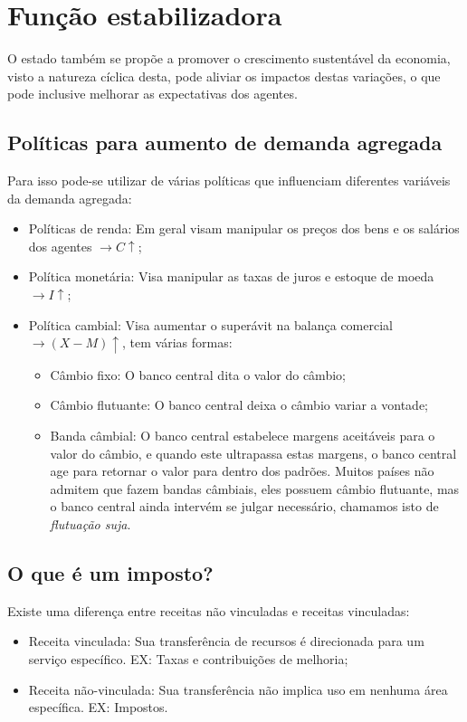 \documentclass[12pt,a4paper,oneside,brazil]{abntex2}
\begin{document}
\section{Função estabilizadora}
O estado também se propõe a promover o crescimento sustentável da economia, visto a natureza cíclica desta, pode aliviar os impactos destas variações, o que pode inclusive melhorar as expectativas dos agentes. 
\subsection{Políticas para aumento de demanda agregada}
Para isso pode-se utilizar de várias políticas que influenciam diferentes variáveis da demanda agregada:
\begin{itemize}
\item Políticas de renda: Em geral visam manipular os preços dos bens e os salários dos agentes $ \rightarrow C \uparrow$;
\item Política monetária: Visa manipular as taxas de juros e estoque de moeda $ \rightarrow I \uparrow$;
\item Política cambial: Visa aumentar o superávit na balança comercial $ \rightarrow (X - M) \uparrow$, tem várias formas:
\begin{itemize}
\item Câmbio fixo: O banco central dita o valor do câmbio;
\item Câmbio flutuante: O banco central deixa o câmbio variar a vontade;
\item Banda câmbial: O banco central estabelece margens aceitáveis para o valor do câmbio, e quando este ultrapassa estas margens, o banco central age para retornar o valor para dentro dos padrões. Muitos países não admitem que fazem bandas câmbiais, eles possuem câmbio flutuante, mas o banco central ainda intervém se julgar necessário, chamamos isto de \emph{flutuação suja}.
\end{itemize}
\end{itemize}
\subsection{O que é um imposto?}
Existe uma diferença entre receitas não vinculadas e receitas vinculadas:
\begin{itemize}
\item Receita vinculada: Sua transferência de recursos é direcionada para um serviço específico. EX: Taxas e contribuições de melhoria;
\item Receita não-vinculada: Sua transferência não implica uso em nenhuma área específica. EX: Impostos.
\end{itemize}
\end{document}

